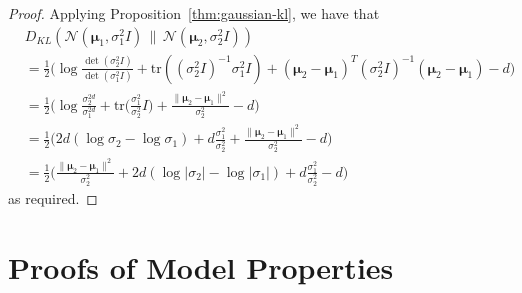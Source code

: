 \documentclass[10pt]{article}
\newcommand{\ves}[1]{\boldsymbol{#1}}
\newcommand{\tr}{\mathrm{tr}}
\begin{document}
\begin{itemize}
  \begin{proof}
    Applying Proposition~\ref{thm:gaussian-kl}, we have that
    \begin{align*}
      & D_{KL}(\mathcal{N}(\ves{\mu}_1, \sigma_1^2 I)\, \|\, \mathcal{N}(\ves{\mu}_2, \sigma_2^2 I)) \\
      &= \frac{1}{2} \bigg(  \log \frac{\det (\sigma_2^2 I)}{\det (\sigma_1^2 I)}  + \tr( (\sigma_2^2 I)^{-1}\sigma_1^2 I ) + (\ves{\mu}_2 - \ves{\mu}_1)^T (\sigma_2^2 I)^{-1} (\ves{\mu}_2 - \ves{\mu}_1) - d  \bigg) \\
      &= \frac{1}{2} \bigg(  
        \log \frac{\sigma_2^{2d}}{\sigma_1^{2d}}  
        + \tr\Big( \frac{\sigma_1^2}{\sigma_2^2} I \Big) 
        + \frac{\| \ves{\mu}_2 - \ves{\mu}_1 \|^2}{\sigma_2^2}
        - d  \bigg) \\
      &= \frac{1}{2} \bigg( 
        2d(\log \sigma_2 - \log \sigma_1)
        + d \frac{\sigma_1^2}{\sigma_2^2} 
        + \frac{\| \ves{\mu}_2 - \ves{\mu}_1 \|^2}{\sigma_2^2}
        - d
        \bigg) \\
        &= \frac{1}{2} \bigg( 
          \frac{\| \ves{\mu}_2 - \ves{\mu}_1 \|^2}{\sigma_2^2}          
          + 2d(\log |\sigma_2| - \log |\sigma_1|)
          + d \frac{\sigma_1^2}{\sigma_2^2} 
          - d
          \bigg)
    \end{align*}
    as required.
  \end{proof}
\end{itemize}

\pagebreak

\section{Proofs of Model Properties} \label{sec:model-properties}
\end{document}
